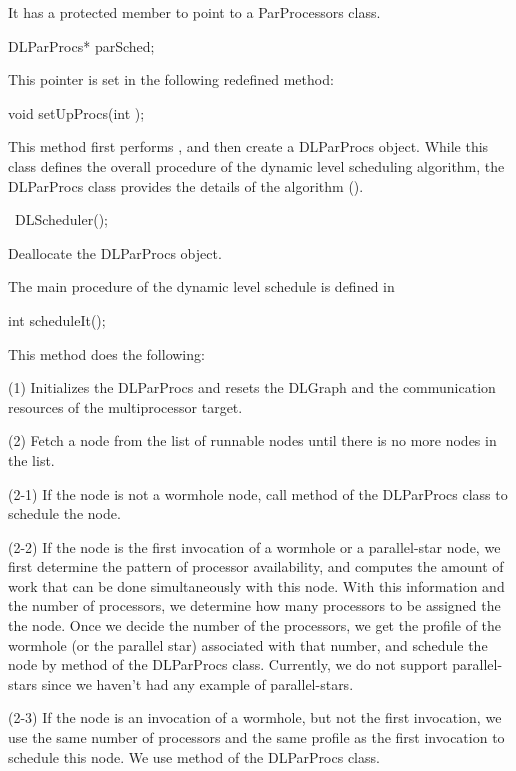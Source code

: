 It has a protected member to point to a ParProcessors class.

\begin{example}
DLParProcs* parSched;
\end{example}

This pointer is set in the following redefined method:

\begin{example}
void setUpProcs(int );
\end{example}

This method first performs , and then
create a DLParProcs object. While this class defines the overall
procedure of the dynamic level scheduling algorithm, the DLParProcs class
provides the details of the algorithm (). 

\begin{example}
~DLScheduler();
\end{example}

Deallocate the DLParProcs object.

The main procedure of the dynamic level schedule is defined in

\begin{example}
int scheduleIt();
\end{example}

This method does the following:

(1) Initializes the DLParProcs and resets the DLGraph and
the communication resources of the multiprocessor target.

(2) Fetch a node from the list of runnable nodes until there is no more nodes
in the list.

(2-1) If the node is not a wormhole node, call  method
of the DLParProcs class to schedule the node.

(2-2) If the node is the first invocation of a wormhole or a parallel-star
node, we first determine the pattern of processor availability, and computes
the amount of work that can be done simultaneously with this node. With
this information and the number of processors, we determine how many
processors to be assigned the the node. Once we decide the number of the
processors, we get the profile of the wormhole (or the parallel star)
associated with that number, and schedule the node by 
method of the DLParProcs class. Currently, we do not support parallel-stars
since we haven't had any example of parallel-stars.

(2-3) If the node is an invocation of a wormhole, but not the first invocation,
we use the same number of processors and the same profile as the first
invocation to schedule this node. We use  method of
the DLParProcs class. 

